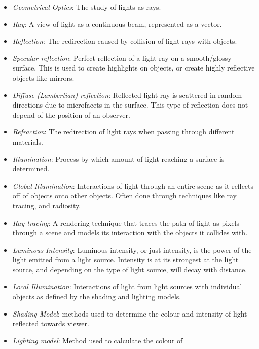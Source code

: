 \documentclass[12pt]{article}
\begin{document}
\begin{itemize}
\item[\label{}] \textit{Geometrical Optics}: The study of lights as rays.
\item[\label{}] \textit{Ray}: A view of light as a continuous beam, represented 
as a 
vector.
\item[\label{}] \textit{Reflection}: The redirection caused by collision of 
light rays 
with objects.
\item[\label{}] \textit{Specular reflection}: Perfect reflection of a light ray 
on a smooth/glossy surface. This is used to create highlights on objects, or 
create highly reflective objects like mirrors.
\item[\label{}] \textit{Diffuse (Lambertian) reflection}: Reflected light ray 
is scattered in random directions due to microfacets in the surface. This type 
of reflection does not depend of the position of an observer.
\item[\label{}] \textit{Refraction}: The redirection of light rays when passing 
through 
different materials.
\item[\label{}] \textit{Illumination}: Process by which amount of light 
reaching a 
surface is determined.
\item[\label{}] \textit{Global Illumination}: Interactions of light through an 
entire scene as it reflects off of objects onto other objects. Often done 
through techniques like ray tracing, and radiosity.
\item[\label{}] \textit{Ray tracing}: A rendering technique that traces the 
path of light as pixels through a scene and models its interaction with the 
objects it collides with.
\item[\label{}] \textit{Luminous Intensity}: Luminous intensity, or just 
intensity, is the power of the light emitted from a light source. Intensity is 
at its strongest at the light source, and depending on the type of light 
source, will decay with distance.
\item[\label{}] \textit{Local Illumination}: Interactions of light from light 
sources with individual objects as defined by the shading and lighting models.
\item[\label{}] \textit{Shading Model}: methods used to determine the colour 
and intensity of light reflected towards viewer. 
\item[\label{}]\textit{Lighting model}: Method used to calculate the colour of 

\end{itemize}
\end{document}
